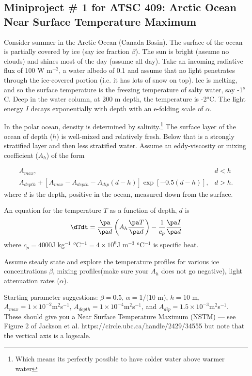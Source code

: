 \documentclass[12pt]{article}
\begin{document}
\subsection*{Miniproject \# 1 for ATSC 409: Arctic Ocean Near Surface Temperature Maximum}

Consider summer in the Arctic Ocean (Canada Basin).  The surface of
the ocean is partially covered by ice (say ice fraction $\beta$).  The sun
is bright (assume no clouds) and shines most of the day (assume all
day).  Take an incoming radiative flux of 100 W m$^{-2}$, a water albedo of
0.1 and assume that no light penetrates through the ice-covered portion
(i.e. it has lots of snow on top).  Ice is melting, and so the surface
temperature is the freezing temperature of salty water, say
-1$^o$C. Deep in the water column, at 200 m depth, the temperature is
-2$^o$C.  The light energy $I$ decays exponentially with depth with an
e-folding scale of $\alpha$.

In the polar ocean, density is determined by salinity.\footnote{Which
  means its perfectly possible to have colder water above warmer
  water} The surface layer of the ocean of depth ($h$) is well-mixed
and relatively fresh.  Below that is a strongly stratified layer and
then less stratified water.  Assume an eddy-viscosity or mixing
coefficient ($A_h$) of the form

\begin{eqnarray}
 A_{max}, & d < h \\ 
A_{depth} + \left[A_{max}-A_{depth}-A_{dip}(d-h)\right] \exp \left[-0.5(d-h)\right], & d > h.
\end{eqnarray}
where $d$ is the depth, positive in the ocean, measured down from the surface.

An equation for the temperature $T$ as a function of depth, $d$ is
\begin{equation}
\dTdt = \frac {\pa}{\pa d} \left(A_h \frac {\pa T}{\pa d} \right) - \frac 1 {c_p} \frac {\pa I}{\pa d}
\end{equation}
where $c_p = 4000$J kg$^{-1}$ $^o$C$^{-1} = 4 \times 10^6$J m$^{-3}$ $^o$C$^{-1}$ is specific heat. 

Assume steady state and explore the temperature profiles for various ice concentrations $\beta$, mixing profiles(make sure your $A_h$ does not go negative), light attenuation rates ($\alpha$).

Starting parameter suggestions: $\beta = 0.5$, $\alpha = 1/(10$ m), $h = 10$ m, $A_{max} = 1 \times 10^{-2} $m$^2$s$^{-1}$, $A_{depth} = 1 \times 10^{-4} $m$^2$s$^{-1}$, and $A_{dip} = 1.5 \times 10^{-3} $m$^2$s$^{-1}$.  These should give you a Near Surface Temperature Maximum (NSTM) --- see Figure 2 of Jackson et al. https://circle.ubc.ca/handle/2429/34555 but note that the vertical axis is a logscale.
\end{document}
